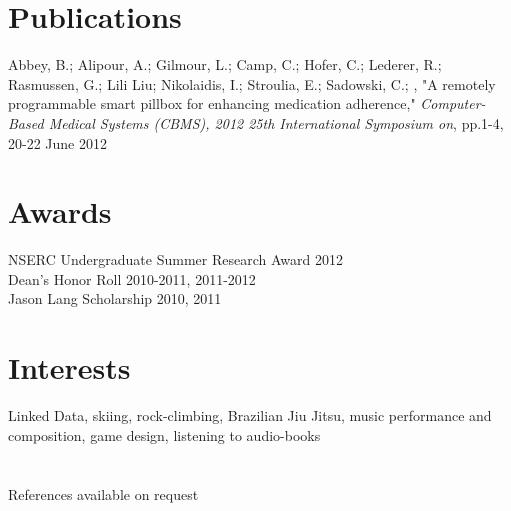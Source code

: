 \documentclass[10pt]{article}
\begin{document}
\section*{Publications}
Abbey, B.; Alipour, A.; Gilmour, L.; Camp, C.; Hofer, C.; Lederer, R.; Rasmussen, G.; Lili Liu; Nikolaidis, I.; Stroulia, E.; Sadowski, C.; , "A remotely programmable smart pillbox for enhancing medication adherence," \emph{Computer-Based Medical Systems (CBMS), 2012 25th International Symposium on}, pp.1-4, 20-22 June 2012

\section*{Awards}
\noindent NSERC Undergraduate Summer Research Award \hfill 2012 \\

\noindent Dean's Honor Roll \hfill 2010-2011, 2011-2012 \\

\noindent Jason Lang Scholarship \hfill 2010, 2011 \\



\section*{Interests}
Linked Data, skiing, rock-climbing, Brazilian Jiu Jitsu, music performance and composition, game design, listening to audio-books\\ \\ \\


\noindent References available on request
\end{document}
